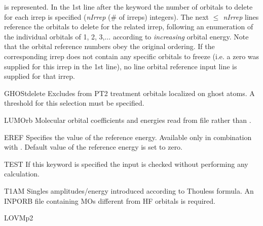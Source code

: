 \begin{keywordlist}
is represented. In the 1st line after the keyword the number of orbitals
to delete for each irrep is specified ({\it nIrrep} (\# of irreps) integers).
The next {\it $\leq$ nIrrep} lines reference the orbitals to delete for the
related irrep, following an enumeration of the individual orbitals
of 1, 2, 3,$\ldots$ according to
{\it increasing} orbital energy. Note that the orbital reference numbers
obey the original ordering.
If the corresponding irrep does not contain any
specific orbitals to freeze (i.e. a zero was supplied for this irrep in the
1st line), no line orbital reference input line is supplied for that irrep.
\item[GHOStdelete]
Excludes from PT2 treatment orbitals localized on ghost atoms.  A threshold for this selection must be specified.
\item[LUMOrb]
Molecular orbital coefficients and energies read from  file rather
than .
\item[EREF]
Specifies the value of the reference energy. Available only in combination
with . Default value of the reference energy is set to zero.
\item[TEST]
If this keyword is specified the input is checked without performing any
calculation.
\item[T1AM]
Singles amplitudes/energy introduced according to Thouless formula.
An INPORB file containing MOs different from HF orbitals is required.
\item[LOVMp2]

\end{keywordlist}
